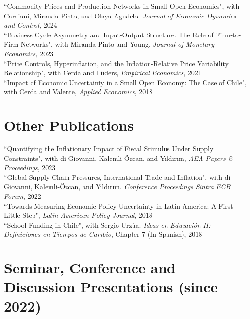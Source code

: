 \documentclass[10pt]{article}
\begin{document}
\noindent ``Commodity Prices and Production Networks in Small Open Economies", with Caraiani, Miranda-Pinto, and Olaya-Agudelo. \textit{Journal of Economic Dynamics and Control,} 2024\\[-0.125in]


\noindent ``Business Cycle Asymmetry and Input-Output Structure: The Role of Firm-to-Firm Networks", with Miranda-Pinto and Young, \textit{Journal of Monetary Economics,} 2023\\[-0.125in]

\noindent ``Price Controls, Hyperinflation, and the Inflation-Relative Price Variability Relationship", with Cerda and L\"{u}ders, \emph{Empirical Economics}, 2021\\[-0.125in]
   
 \noindent ``Impact of Economic Uncertainty in a Small Open Economy: The Case of Chile", with Cerda and Valente, \emph{Applied Economics}, 2018

\section*{Other Publications}
   
\noindent ``Quantifying the Inflationary Impact of Fiscal Stimulus Under Supply Constraints", with di Giovanni, Kalemli-\"{O}zcan, and Y{\i}ld{\i}r{\i}m, \emph{AEA Papers \& Proceedings}, 2023\\[-0.125in]
   
\noindent ``Global Supply Chain Pressures, International Trade and Inflation", with di Giovanni, Kalemli-\"{O}zcan, and Y{\i}ld{\i}r{\i}m. {\emph{Conference Proceedings Sintra ECB Forum}}, 2022\\[-0.125in]
   
 \noindent ``Towards Measuring Economic Policy Uncertainty in Latin America: A First Little Step", \emph{Latin American Policy Journal}, 2018 \\[-0.125in]

\noindent ``School Funding in Chile", with Sergio Urz\'ua. \emph{Ideas en Educaci\'on II: Definiciones en Tiempos de Cambio}, Chapter 7 (In Spanish), 2018

\section*{Seminar, Conference and Discussion Presentations (since 2022)}
\end{document}
